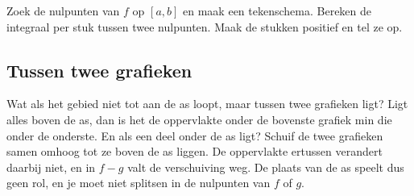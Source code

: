 \begin{werkwijze}
Zoek de nulpunten van $f$ op $[a, b]$ en maak een tekenschema. Bereken de integraal per stuk tussen twee nulpunten. Maak de stukken positief en tel ze op.
\end{werkwijze}


\begin{oefeningen}
\end{oefeningen}

\subsection{Tussen twee grafieken}

Wat als het gebied niet tot aan de as loopt, maar tussen twee grafieken ligt? Ligt alles boven de as, dan is het de oppervlakte onder de bovenste grafiek min die onder de onderste. En als een deel onder de as ligt? Schuif de twee grafieken samen omhoog tot ze boven de as liggen. De oppervlakte ertussen verandert daarbij niet, en in $f - g$ valt de verschuiving weg. De plaats van de as speelt dus geen rol, en je moet niet splitsen in de nulpunten van $f$ of $g$.


